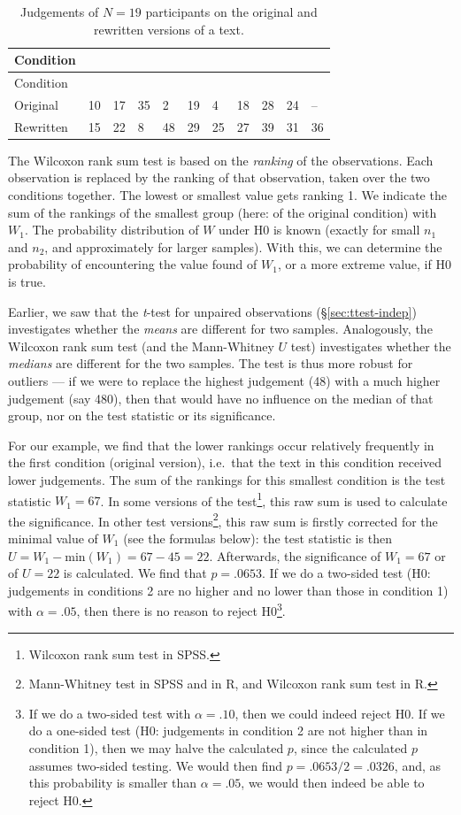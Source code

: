 \documentclass[
]{book}
\begin{document}
\begin{longtable}[]{@{}lllllllllll@{}}
\caption{\label{tab:data-originalrewritten} Judgements of \(N=19\) participants on
the original and rewritten versions of a text.}\tabularnewline
\toprule
Condition & & & & & & & & & &\tabularnewline
\midrule
\endfirsthead
\toprule
Condition & & & & & & & & & &\tabularnewline
\midrule
\endhead
Original & 10 & 17 & 35 & 2 & 19 & 4 & 18 & 28 & 24 & --\tabularnewline
Rewritten & 15 & 22 & 8 & 48 & 29 & 25 & 27 & 39 & 31 & 36\tabularnewline
\bottomrule
\end{longtable}

The Wilcoxon rank sum test is based on the \emph{ranking} of the
observations. Each observation is replaced by the ranking of
that observation, taken over the two conditions together. The lowest or
smallest value gets ranking 1. We indicate the sum of the rankings of the
smallest group (here: of the original condition) with
\(W_1\). The probability distribution of \(W\) under H0 is known (exactly for small
\(n_1\) and \(n_2\), and approximately for larger samples). With this, we can
determine the probability of encountering the value found of \(W_1\),
or a more extreme value, if H0 is true.

Earlier, we saw that the \emph{t}-test for unpaired observations
(§\ref{sec:ttest-indep}) investigates whether the \emph{means}
are different for two samples. Analogously, the Wilcoxon
rank sum test (and the Mann-Whitney \(U\) test) investigates whether the
\emph{medians} are different for the two samples. The test is thus more
robust for outliers --- if we were to replace the highest judgement (48)
with a much higher judgement (say 480), then that would have no influence
on the median of that group, nor on the test statistic or its
significance.

For our example, we find that the lower rankings occur relatively frequently
in the first condition (original version), i.e.~that the text in this condition
received lower judgements. The sum of the rankings for this
smallest condition is the test statistic \(W_1=67\). In some versions of the
test\footnote{Wilcoxon rank sum test in SPSS.}, this raw sum is used to calculate the significance.
In other test versions\footnote{Mann-Whitney test in SPSS and in R, and Wilcoxon rank sum test in R.}, this raw sum is firstly corrected for the
minimal value of \(W_1\) (see the formulas below): the test statistic
is then \(U=W_1 - \textrm{min}(W_1) = 67-45=22\). Afterwards, the significance
of \(W_1=67\) or of \(U=22\) is calculated. We find that \(p=.0653\). If we do a
two-sided test (H0: judgements in conditions 2 are no higher and no lower
than those in condition 1) with \(\alpha=.05\), then there is no reason to
reject H0\footnote{If we do a two-sided test with \(\alpha=.10\), then we could indeed
  reject H0. If we do a one-sided test (H0: judgements in condition 2 are not higher
  than in condition 1), then we may halve the calculated \(p\), since the calculated
  \(p\) assumes two-sided testing. We would then find \(p=.0653/2=.0326\), and,
  as this probability is smaller than \(\alpha=.05\), we would then indeed
  be able to reject H0.}.
\end{document}
